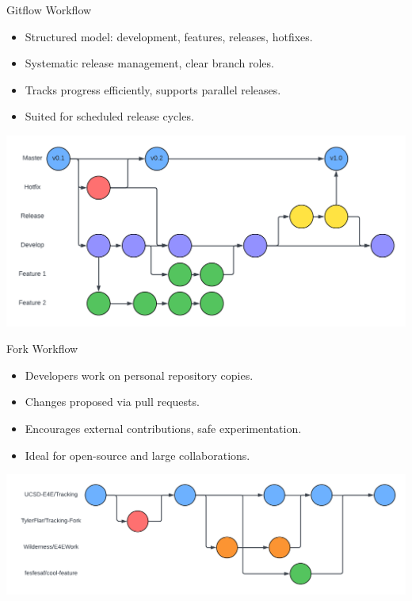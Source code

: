 \documentclass[aspectratio=169]{beamer}
\begin{document}
\begin{frame}{Gitflow Workflow}
    \begin{itemize}
        \item Structured model: development, features, releases, hotfixes.
        \item Systematic release management, clear branch roles.
        \item Tracks progress efficiently, supports parallel releases.
        \item Suited for scheduled release cycles.
    \end{itemize}
    \begin{center}
        \includegraphics[scale=.2]{gitflow_workflow_diagram.png}
    \end{center}
\end{frame}
\begin{frame}{Fork Workflow}
    \begin{itemize}
        \item Developers work on personal repository copies.
        \item Changes proposed via pull requests.
        \item Encourages external contributions, safe experimentation.
        \item Ideal for open-source and large collaborations.
    \end{itemize}
    \begin{center}
        \includegraphics[scale=.25]{fork_workflow_diagram.png}
    \end{center}
\end{frame}
\end{document}
